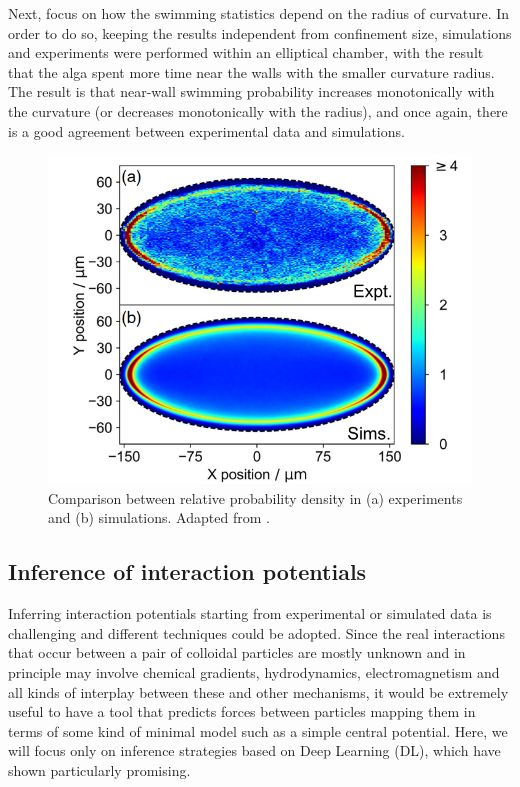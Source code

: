 \documentclass[../../master_thesis_np.tex]{subfiles}
\begin{document}
	Next, \citeauthor{ostapenko_curvature-guided_2018} focus on how the swimming statistics depend on the radius of curvature. 
	In order to do so, keeping the results independent from confinement size, simulations and experiments were performed within an elliptical chamber, with the result that the alga spent more time near the walls with the smaller curvature radius. 
	The result is that near-wall swimming probability increases monotonically with the curvature (or decreases monotonically with the radius), and once again, there is a good agreement between experimental data and simulations.
	\begin{figure}[htp]
		\centering
		\includegraphics[width=\singfigwidth]{ostapenko2.png}
		\caption{Comparison between relative probability density in (a) experiments and (b) simulations. Adapted from \cite{ostapenko_curvature-guided_2018}.}
		\label{fig:ostapenko2}
	\end{figure}
	
	\subsection{Inference of interaction potentials}
	Inferring interaction potentials starting from experimental or simulated data is challenging and different techniques could be adopted. 
	Since the real interactions that occur between a pair of colloidal particles are mostly unknown and in principle may involve chemical gradients, hydrodynamics, electromagnetism and all kinds of interplay between these and other mechanisms, it would be extremely useful to have a tool that predicts forces between particles mapping them in terms of some kind of minimal model such as a simple central potential. 
	Here, we will focus only on inference strategies based on Deep Learning (DL), which have shown particularly promising. 
	
\end{document}
